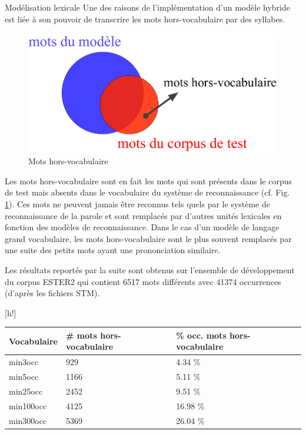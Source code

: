 \documentclass{style/these}
\makeatletter
\renewcommand\familydefault{ptm}
\renewenvironment{table}%
{ \renewcommand{\familydefault}{ptm}\selectfont
  \@float{table}}
  {\end@float}
\makeatother
\begin{document}
\begin{part}{Modélisation lexicale}
Une des raisons de l'implémentation d'un modèle hybride est liée à son pouvoir de transcrire les mots hors-vocabulaire par des syllabes. 

\begin{figure}[h!]
\centering
\includegraphics[scale=0.53]{images/pictures/vocabulary.pdf}
\caption{Mots hors-vocabulaire}
\label{Fig:OOVwords}
\end{figure}


Les mots hors-vocabulaire sont en fait les mots qui sont présents dans le corpus de test mais absents dans le vocabulaire du système de reconnaissance (cf. Fig. \ref{Fig:OOVwords}). 
Ces mots ne peuvent jamais être reconnus tels quels par le système de reconnaissance de la parole et sont remplacés par d'autres unités lexicales en fonction des modèles de reconnaissance. 
Dans le cas d'un modèle de langage grand vocabulaire, les mots hors-vocabulaire sont le plus souvent remplacés par une suite des petits mots ayant une prononciation similaire. 



Les résultats reportés par la suite sont obtenus sur l'ensemble de développement du corpus ESTER2 qui contient 6517 mots différents avec 41374 occurrences (d'après les fichiers \acrshort{STM}).

\begin{table}[h!]
\centering
\begin{tabular}{|l|R{3.5cm}|R{3.5cm}|}
\hline
\textbf{Vocabulaire}	& \textbf{\# mots hors-vocabulaire} & \textbf{\% occ. mots hors-vocabulaire}	  \\ \hline
min3occ 		& 929 	& 4.34 \%	\\ \hline
min5occ 		& 1166	& 5.11 \%	\\ \hline
min25occ 		& 2452	& 9.51 \%	\\ \hline
min100occ 		& 4125	& 16.98	\%	\\ \hline
min300occ 		& 5369 	& 26.04	\%	\\ \hline
\end{tabular}
\caption{Nombre de mots hors-vocabulaire différents, et pourcentage d'occurrences}
\label{Tab:tauxOOV}
\end{table}


\end{part}
\end{document}

